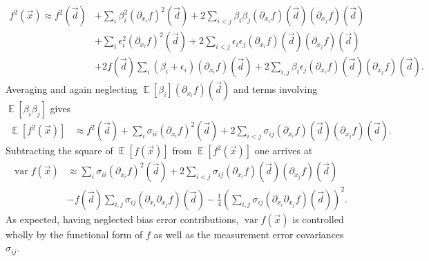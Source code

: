 \documentclass[letterpaper,11pt,nointlimits,reqno,draft]{amsbook}
\newcommand{\expect}[1]{\operatorname{\mathbb{E}}\left[#1\right]}
\begin{document}
\begin{align*}
  f^2\left(\vec{x}\right) \approx f^2\left(\vec{d}\right)
 &+   \sum_i \beta_i^2
             \left(\partial_{x_i} f\right)^2\left(\vec{d}\right)
  +  2\sum_{i<j} \beta_i \beta_j
                 \left(\partial_{x_i} f\right)\left(\vec{d}\right)
                 \left(\partial_{x_j} f\right)\left(\vec{d}\right)
\\
 &+   \sum_i \epsilon_i^2  \left(\partial_{x_i} f\right)^2\left(\vec{d}\right)
  +  2\sum_{i<j} \epsilon_i \epsilon_j
                 \left(\partial_{x_i} f\right)\left(\vec{d}\right)
                 \left(\partial_{x_j} f\right)\left(\vec{d}\right)
\\
 &+ 2 f\left(\vec{d}\right) \sum_i
                            \left(\beta_i+\epsilon_i\right)
                            \left(\partial_{x_i} f\right)\left(\vec{d}\right)
  + 2 \sum_{i,j} \beta_i \epsilon_j
                 \left(\partial_{x_i} f\right)\left(\vec{d}\right)
                 \left(\partial_{x_j} f\right)\left(\vec{d}\right)
.
\end{align*}
Averaging and again neglecting $\expect{\beta_i}\left(\partial_{x_i}
f\right)\left(\vec{d}\right)$ and terms involving $\expect{\beta_i \beta_j}$
gives
\begin{align*}
  \expect{f^2\left(\vec{x}\right)}
&\approx
    f^2\left(\vec{d}\right)
  +  \sum_i \sigma_{ii}     \left(\partial_{x_i} f\right)^2\left(\vec{d}\right)
  + 2\sum_{i<j} \sigma_{ij} \left(\partial_{x_i} f\right)  \left(\vec{d}\right)
                            \left(\partial_{x_j} f\right)  \left(\vec{d}\right)
.
\end{align*}
Subtracting the square of $\expect{f\left(\vec{x}\right)}$ from
$\expect{f^2\left(\vec{x}\right)}$ one arrives at
\begin{align*}
  \operatorname{var} f\left(\vec{x}\right)
&\approx
     \sum_i \sigma_{ii}     \left(\partial_{x_i} f\right)^2\left(\vec{d}\right)
  + 2\sum_{i<j} \sigma_{ij} \left(\partial_{x_i} f\right)  \left(\vec{d}\right)
                            \left(\partial_{x_j} f\right)  \left(\vec{d}\right)
\\
 &- f\left(\vec{d}\right)
    \sum_{i,j} \sigma_{ij}
    \left(\partial_{x_i} \partial_{x_j} f\right)\left(\vec{d}\right)
  - \frac{1}{4} \left(
      \sum_{i,j} \sigma_{ij}
      \left(\partial_{x_i} \partial_{x_j} f\right)\left(\vec{d}\right)
    \right)^2
.
\end{align*}
As expected, having neglected bias error contributions, $\operatorname{var}
f\left(\vec{x}\right)$ is controlled wholly by the functional form of $f$ as
well as the measurement error covariances $\sigma_{ij}$.
\end{document}
